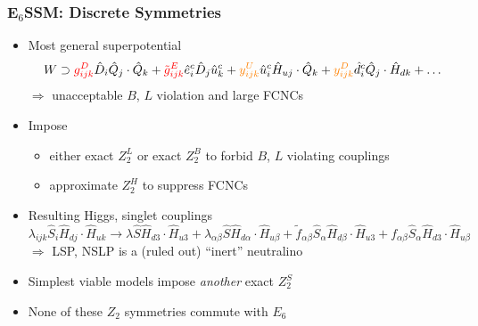 \documentclass[10pt,aspectratio=169]{beamer}
\begin{document}
\begin{frame}
  \frametitle{E$_6$SSM: Discrete Symmetries}
  \begin{itemize}\itemsep0.8em
  \item Most general superpotential
    \begin{equation*}
      W \supset {\color{red} g_{ijk}^D} \hat{D}_i \hat{Q}_j \cdot \hat{Q}_k
      + {\color{red} \tilde{g}_{ijk}^E} \hat{e}_i^c \hat{D}_j \hat{u}_k^c
      + {\color{orange} y_{ijk}^U} \hat{u}_i^c \hat{H}_{uj} \cdot \hat{Q}_k
      + {\color{orange} y_{ijk}^D} \hat{d}_i^c \hat{Q}_j \cdot
      \hat{H}_{dk} + \ldots
    \end{equation*}
    $\Rightarrow$ {\color{red} unacceptable $B$, $L$ violation} and
        {\color{orange} large FCNCs}
      \item Impose
        \begin{itemize}
          \item either exact $Z_2^L$ or exact $Z_2^B$ to forbid
            $B$, $L$ violating couplings
          \item approximate $Z_2^H$ to suppress FCNCs
        \end{itemize}
    \item Resulting Higgs, singlet couplings
      \begin{equation*}
        \lambda_{ijk} \hat{S}_i \hat{H}_{dj} \cdot \hat{H}_{uk}
        \rightarrow \lambda \hat{S} \hat{H}_{d3} \cdot \hat{H}_{u3}
        + \lambda_{\alpha\beta} \hat{S} \hat{H}_{d\alpha} \cdot
        \hat{H}_{u\beta} + \tilde{f}_{\alpha\beta} \hat{S}_\alpha
        \hat{H}_{d\beta} \cdot \hat{H}_{u3} + f_{\alpha\beta}
        \hat{S}_\alpha \hat{H}_{d3} \cdot \hat{H}_{u\beta}
      \end{equation*}
      $\Rightarrow$ LSP, NSLP is a (ruled out) ``inert'' neutralino
    \item Simplest viable models impose \emph{another} exact $Z_2^S$
    \item \alert{None of these $Z_2$ symmetries commute with $E_6$}
  \end{itemize}
\end{frame}
\end{document}
